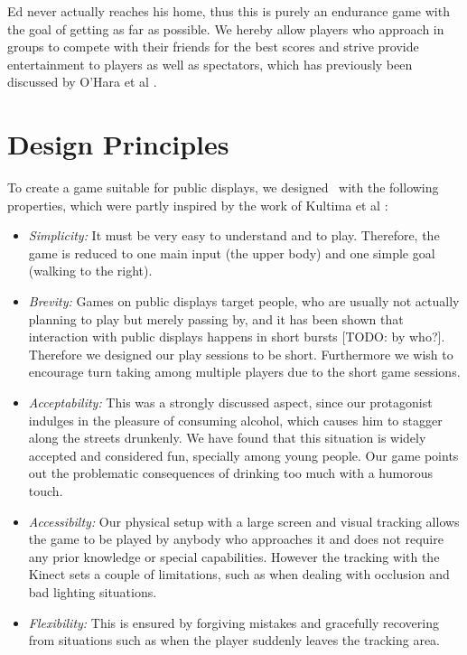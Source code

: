 \documentclass{chi-ext}
\begin{document}
Ed never actually reaches his home, thus this is purely an endurance game with the goal of getting as far as possible. We hereby allow players who approach in groups to compete with their friends for the best scores and strive provide entertainment to players as well as spectators, which has previously been discussed by O'Hara et al \cite{ohara2008understanding}.\\


%

\section{Design Principles}
%
To create a game suitable for public displays, we designed \drunkened\ with the following properties, which were partly inspired by the work of Kultima et al \cite{kultima2009casual}:
\begin{itemize}\compresslist
\item \textit{Simplicity:} It must be very easy to understand and to play. Therefore, the game is reduced to one main input (the upper body) and one simple goal (walking to the right).
\item \textit{Brevity:} Games on public displays target people, who are usually not actually planning to play but merely passing by, and it has been shown that interaction with public displays happens in short bursts [TODO: by who?]. Therefore we designed our play sessions to be short. Furthermore we wish to encourage turn taking among multiple players due to the short game sessions.
\item \textit{Acceptability:} This was a strongly discussed aspect, since our protagonist indulges in the pleasure of consuming alcohol, which causes him to stagger along the streets drunkenly. We have found that this situation is widely accepted and considered fun, specially among young people. Our game points out the problematic consequences of drinking too much with a humorous touch.
\item \textit{Accessibilty:} Our physical setup with a large screen and visual tracking allows the game to be played by anybody who approaches it and does not require any prior knowledge or special capabilities. However the tracking with the Kinect sets a couple of limitations, such as when dealing with occlusion and bad lighting situations.
\item \textit{Flexibility:} This is ensured by forgiving mistakes and gracefully recovering from situations such as when the player suddenly leaves the tracking area.
\end{itemize}
\end{document}

